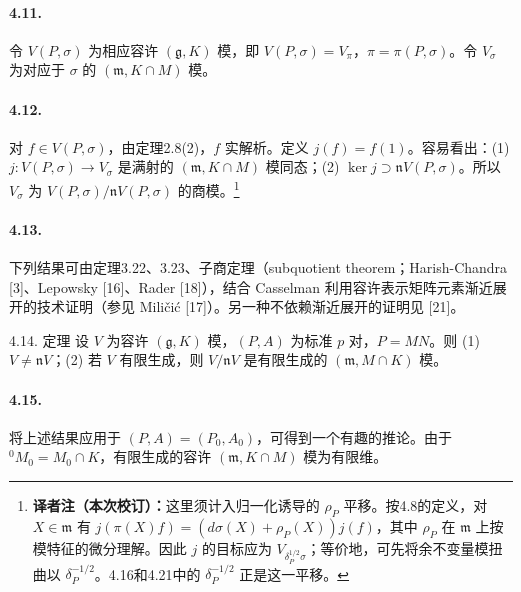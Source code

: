 \paragraph*{4.11.} 令 $V(P,\sigma)$ 为相应容许 $(\mathfrak g,K)$ 模，即 $V(P,\sigma)=V_\pi$，$\pi=\pi(P,\sigma)$。令 $V_\sigma$ 为对应于 $\sigma$ 的 $(\mathfrak m,K\cap M)$ 模。
\paragraph*{4.12.} 对 $f\in V(P,\sigma)$，由定理2.8(2)，$f$ 实解析。定义 $j(f)=f(1)$。容易看出：(1) $j:V(P,\sigma)\to V_\sigma$ 是满射的 $(\mathfrak m,K\cap M)$ 模同态；(2) $\ker j\supset\mathfrak n V(P,\sigma)$。所以 $V_\sigma$ 为 $V(P,\sigma)/\mathfrak n V(P,\sigma)$ 的商模。\footnote{\textbf{译者注（本次校订）：}这里须计入归一化诱导的 $\rho_P$ 平移。按4.8的定义，对 $X\in\mathfrak m$ 有 $j(\pi(X)f)=(d\sigma(X)+\rho_P(X))j(f)$，其中 $\rho_P$ 在 $\mathfrak m$ 上按模特征的微分理解。因此 $j$ 的目标应为 $V_{\delta_P^{1/2}\sigma}$；等价地，可先将余不变量模扭曲以 $\delta_P^{-1/2}$。4.16和4.21中的 $\delta_P^{-1/2}$ 正是这一平移。}
\paragraph*{4.13.} 下列结果可由定理3.22、3.23、子商定理（subquotient theorem；Harish-Chandra [3]、Lepowsky [16]、Rader [18]），结合 Casselman 利用容许表示矩阵元素渐近展开的技术证明（参见 Miličić [17]）。另一种不依赖渐近展开的证明见 [21]。
\begin{originaltheorem}{4.14. 定理}
设 $V$ 为容许 $(\mathfrak g,K)$ 模，$(P,A)$ 为标准 $p$ 对，$P=MN$。则 (1) $V\ne\mathfrak nV$；(2) 若 $V$ 有限生成，则 $V/\mathfrak nV$ 是有限生成的 $(\mathfrak m,M\cap K)$ 模。
\end{originaltheorem}
\paragraph*{4.15.} 将上述结果应用于 $(P,A)=(P_0,A_0)$，可得到一个有趣的推论。由于 ${}^0M_0=M_0\cap K$，有限生成的容许 $(\mathfrak m,K\cap M)$ 模为有限维。
